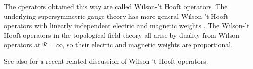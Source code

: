 The operators obtained this way are called Wilson-'t Hooft
operators.  The underlying supersymmetric gauge theory has more
general Wilson-'t Hooft operators with linearly independent
electric and magnetic weights \cite{ref90}.  The Wilson-'t Hooft
operators in the topological field theory all arise by duality
from Wilson operators at $\Psi=\infty$, so their electric and
magnetic weights are proportional.

See also \cite{ref92} for a recent related
discussion of Wilson-'t Hooft operators.
